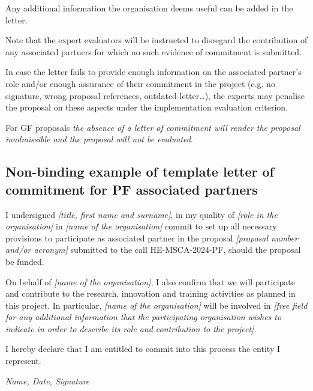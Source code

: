\documentclass[11pt,draftproposal]{msca-pf}
\begin{document}
Any additional information the organisation deems useful can be added in the letter.

Note that the expert evaluators will be instructed to disregard the contribution
of any associated partners for which no such evidence of commitment is submitted.

In case the letter fails to provide enough information on the associated partner's
role and/or enough assurance of their commitment in the project (e.g. no signature,
wrong proposal references, outdated letter…), the experts may penalise the
proposal on these aspects under the implementation evaluation criterion.

For GF proposals \emph{the absence of a letter of commitment will render the
proposal inadmissible and the proposal will not be evaluated}.

\subsection*{Non-binding example of template letter of commitment for PF associated partners}

I undersigned \emph{[title, first name and surname]}, in my quality of
\emph{[role in the organisation]} in \emph{[name of the organisation]} commit
to set up all necessary provisions to participate as associated partner in the
proposal \emph{[proposal number and/or acronym]} submitted to the call
HE-MSCA-2024-PF, should the proposal be funded.

On behalf of \emph{[name of the organisation]}, I also confirm that we will
participate and contribute to the research, innovation and training activities
as planned in this project. In particular, \emph{[name of the organisation]}
will be involved in \emph{[free field for any additional information that the
participating organisation wishes to indicate in order to describe its role and
contribution to the project]}.

I hereby declare that I am entitled to commit into this process the entity I represent.

\hfill \emph{Name, Date, Signature}
\end{document}
